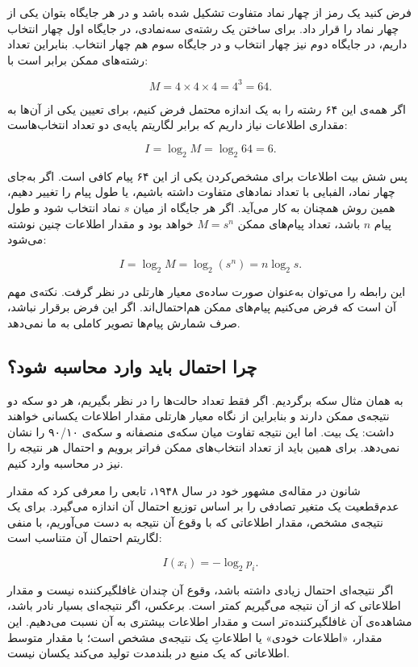 فرض کنید یک رمز از چهار نماد متفاوت تشکیل شده باشد و در هر جایگاه بتوان یکی از چهار نماد را قرار داد. برای ساختن یک رشته‌ی سه‌نمادی، در جایگاه اول چهار انتخاب داریم، در جایگاه دوم نیز چهار انتخاب و در جایگاه سوم هم چهار انتخاب. بنابراین تعداد رشته‌های ممکن برابر است با:

\[
M = 4 \times 4 \times 4 = 4^3 = 64.
\]

اگر همه‌ی این ۶۴ رشته را به یک اندازه محتمل فرض کنیم، برای تعیین یکی از آن‌ها به مقداری اطلاعات نیاز داریم که برابر لگاریتم پایه‌ی دو تعداد انتخاب‌هاست:

\[
I = \log_2 M = \log_2 64 = 6.
\]

پس شش بیت اطلاعات برای مشخص‌کردن یکی از این ۶۴ پیام کافی است. اگر به‌جای چهار نماد، الفبایی با تعداد نمادهای متفاوت داشته باشیم، یا طول پیام را تغییر دهیم، همین روش همچنان به کار می‌آید. اگر هر جایگاه از میان \(s\) نماد انتخاب شود و طول پیام \(n\) باشد، تعداد پیام‌های ممکن \(M=s^n\) خواهد بود و مقدار اطلاعات چنین نوشته می‌شود:

\[
I = \log_2 M = \log_2(s^n)=n\log_2 s.
\]

این رابطه را می‌توان به‌عنوان صورت ساده‌ی معیار هارتلی در نظر گرفت. نکته‌ی مهم آن است که فرض می‌کنیم پیام‌های ممکن هم‌احتمال‌اند. اگر این فرض برقرار نباشد، صرف شمارش پیام‌ها تصویر کاملی به ما نمی‌دهد.

\subsection{چرا احتمال باید وارد محاسبه شود؟}
\label{sub:why-probability-enters}

به همان مثال سکه برگردیم. اگر فقط تعداد حالت‌ها را در نظر بگیریم، هر دو سکه دو نتیجه‌ی ممکن دارند و بنابراین از نگاه معیار هارتلی مقدار اطلاعات یکسانی خواهند داشت: یک بیت. اما این نتیجه تفاوت میان سکه‌ی منصفانه و سکه‌ی ۹۰/۱۰ را نشان نمی‌دهد. برای همین باید از تعداد انتخاب‌های ممکن فراتر برویم و احتمال هر نتیجه را نیز در محاسبه وارد کنیم.

شانون در مقاله‌ی مشهور خود در سال ۱۹۴۸، تابعی را معرفی کرد که مقدار عدم‌قطعیت یک متغیر تصادفی را بر اساس توزیع احتمال آن اندازه می‌گیرد. برای یک نتیجه‌ی مشخص، مقدار اطلاعاتی که با وقوع آن نتیجه به دست می‌آوریم، با منفی لگاریتم احتمال آن متناسب است:

\[
I(x_i)=-\log_2 p_i.
\]

اگر نتیجه‌ای احتمال زیادی داشته باشد، وقوع آن چندان غافلگیرکننده نیست و مقدار اطلاعاتی که از آن نتیجه می‌گیریم کمتر است. برعکس، اگر نتیجه‌ای بسیار نادر باشد، مشاهده‌ی آن غافلگیرکننده‌تر است و مقدار اطلاعات بیشتری به آن نسبت می‌دهیم. این مقدار، «اطلاعات خودی» یا اطلاعاتِ یک نتیجه‌ی مشخص است؛ با مقدار متوسط اطلاعاتی که یک منبع در بلندمدت تولید می‌کند یکسان نیست.


